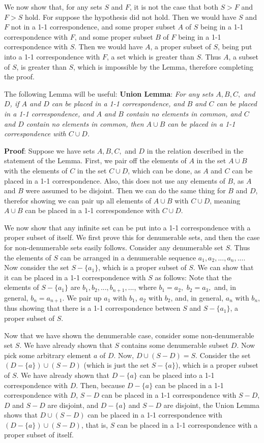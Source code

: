 \documentclass{article}
\theoremstyle{definition}
\begin{document}
We now show that, for any sets $S$ and $F$, it is not the case that both $S>F$ and $F>S$ hold. For suppose the hypothesis did not hold. Then we would have 
$S$ and $F$ not in a 1-1 correspondence, and some proper subset $A$ of $S$ being in a 1-1 correspondence with $F$, and some proper subset $B$ of $F$ being in a 1-1 correspondence with $S$. Then we 
would have $A$, a proper subset of $S$, being put into a 1-1 correspondence with $F$, a set which is greater than $S$. Thus $A$, a subset of $S$, is greater than $S$, which is impossible by the 
Lemma, therefore completing the proof.

The following Lemma will be useful:
\textbf{Union Lemma}:\textit{ For any sets $A,B,C,$ and $D$, if $A$ and $D$ can be placed in a 1-1 correspondence, and $B$ and $C$ can be placed in a 1-1 correspondence, and 
$A$ and $B$ contain no elements in common, and $C$ and $D$ contain no elements in common, then $A\cup B$ can be placed in a 1-1 correspondence with $C\cup D$.}

\textbf{Proof}: Suppose we have sets $A,B,C,$ and $D$ in the relation described in the statement of the Lemma. First, we pair off the elements of $A$ in the set 
$A\cup B$ with the elements of $C$ in the set $C\cup D$, which can be done, as $A$ and $C$ can be placed in a 1-1 correspondence. Also, this does not use any elements of $B$, as 
$A$ and $B$ were assumed to be disjoint. Then we can do the same thing for $B$ and $D$, therefor showing we can pair up all elements of $A\cup B$ with $C\cup D$, meaning 
$A\cup B$ can be placed in a 1-1 correspondence with $C\cup D$.

We now show that any infinite set can be put into a 1-1 correspondence with a proper subset of itself. We first prove this for denumerable sets, and then the case for non-denumerable sets 
easily follows. Consider any denumerable set $S$. Thus the elements of $S$ can be arranged in a denumerable sequence $a_1,a_2,...,a_n,...$. Now consider the set $S-\{a_1\}$, which is a proper 
subset of $S$. We can show that it can be placed in a 1-1 correspondence with $S$ as follows: Note that the elements of $S-\{a_1\}$ are $b_1,b_2,...,b_{n+1},...$, where $b_1=a_2,$ $b_2=a_3,$ and, 
in general, $b_n=a_{n+1}$. We pair up 
$a_1$ with $b_1$, $a_2$ with $b_2$, and, in general, $a_n$ with $b_n$, thus showing that there is a 1-1 correspondence between $S$ and $S-\{a_1\}$, a proper subset of $S$.

Now that we have shown the denumerable case, consider some non-denumerable set $S$. We have already shown that $S$ contains 
some denumerable subset $D$. Now pick some arbitrary element $a$ of $D$. Now, $D\cup (S-D)=S$. Consider the set $(D-\{a\})\cup (S-D)$ (which is just the set $S-\{a\}$), which is a proper subset of 
$S$. We have already shown that $D-\{a\}$ can be placed into a 1-1 correspondence with $D$. Then, because $D-\{a\}$ can be placed in a 1-1 correspondence with $D$, 
$S-D$ can be placed in a 1-1 correspondence with $S-D$, $D$ and $S-D$ are disjoint, and $D-\{a\}$ and $S-D$ are disjoint, the Union Lemma shows that 
$D\cup (S-D)$ can be placed in a 1-1 correspondence with $(D-\{a\})\cup (S-D)$, that is, $S$ can be placed in a 1-1 correspondence with a proper subset of itself. 
\end{document}
